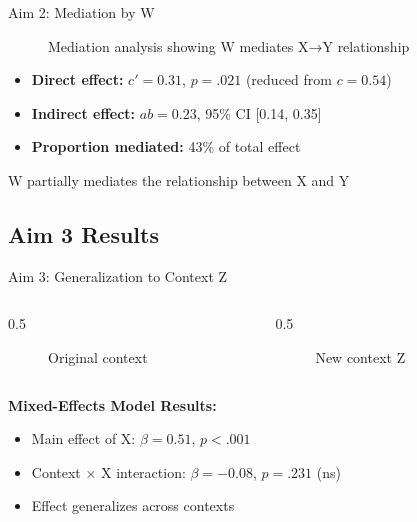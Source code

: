 \documentclass[aspectratio=169,11pt]{beamer}
\begin{document}
\begin{frame}{Aim 2: Mediation by W}
  \begin{figure}
    \centering
    \caption{Mediation analysis showing W mediates X→Y relationship}
  \end{figure}
  
  \begin{itemize}
    \item \textbf{Direct effect:} $c' = 0.31$, $p = .021$ (reduced from $c = 0.54$)
    \item \textbf{Indirect effect:} $ab = 0.23$, 95\% CI [0.14, 0.35]
    \item \textbf{Proportion mediated:} 43\% of total effect
  \end{itemize}
  
  \vspace{0.3cm}
  
  \alert{W partially mediates the relationship between X and Y}
\end{frame}

\subsection{Aim 3 Results}

\begin{frame}{Aim 3: Generalization to Context Z}
  \begin{columns}[T]
    
    \begin{column}{0.5\textwidth}
      \begin{figure}
        \centering
        \framebox[0.9\textwidth][c]{[Context 1]}
        \caption{Original context}
      \end{figure}
    \end{column}
    
    \begin{column}{0.5\textwidth}
      \begin{figure}
        \centering
        \framebox[0.9\textwidth][c]{[Context 2]}
        \caption{New context Z}
      \end{figure}
    \end{column}
    
  \end{columns}
  
  \vspace{0.5cm}
  
  \textbf{Mixed-Effects Model Results:}
  \begin{itemize}
    \item Main effect of X: $\beta = 0.51$, $p < .001$
    \item Context × X interaction: $\beta = -0.08$, $p = .231$ (ns)
    \item \alert{Effect generalizes across contexts}
  \end{itemize}
\end{frame}
\end{document}
